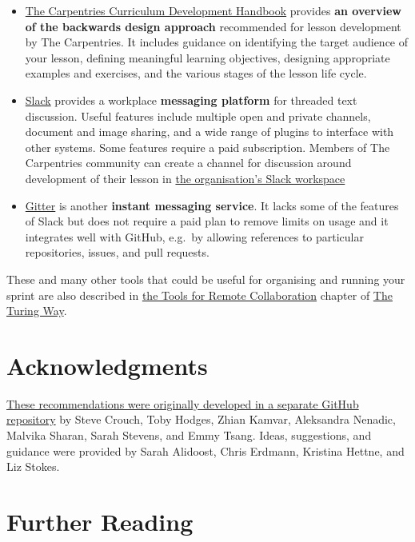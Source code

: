 \documentclass[
]{book}
\begin{document}
\begin{itemize}
\item
  \href{https://cdh.carpentries.org/}{The Carpentries Curriculum Development Handbook}
  provides \textbf{an overview of the backwards design approach} recommended for lesson development by The Carpentries.
  It includes guidance on identifying the target audience of your lesson,
  defining meaningful learning objectives,
  designing appropriate examples and exercises,
  and the various stages of the lesson life cycle.
\item
  \href{https://slack.com/}{Slack}
  provides a workplace \textbf{messaging platform} for threaded text discussion.
  Useful features include multiple open and private channels,
  document and image sharing,
  and a wide range of plugins to interface with other systems.
  Some features require a paid subscription.
  Members of The Carpentries community can
  create a channel for discussion around development of their lesson in
  \href{https://slack-invite.carpentries.org/}{the organisation's Slack workspace}
\item
  \href{https://gitter.im/}{Gitter} is another \textbf{instant messaging service}.
  It lacks some of the features of Slack but does not require a paid plan
  to remove limits on usage and it integrates well with GitHub,
  e.g.~by allowing references to particular repositories, issues, and pull requests.
\end{itemize}

These and many other tools that could be useful for organising and running your sprint are also described in \href{https://the-turing-way.netlify.app/collaboration/remote-collab/remote-collab-tools.html}{the Tools for Remote Collaboration} chapter of \href{https://the-turing-way.netlify.app/}{The Turing Way}.

\hypertarget{acknowledgments}{%
\section{Acknowledgments}\label{acknowledgments}}

\href{https://github.com/tobyhodges/lesson-sprint-recommendations}{These recommendations were originally developed in a separate GitHub repository} by
Steve Crouch,
Toby Hodges,
Zhian Kamvar,
Aleksandra Nenadic,
Malvika Sharan,
Sarah Stevens,
and Emmy Tsang.
Ideas, suggestions, and guidance were provided by
Sarah Alidoost,
Chris Erdmann,
Kristina Hettne,
and Liz Stokes.

\hypertarget{further-reading}{%
\section{Further Reading}\label{further-reading}}
\end{document}
